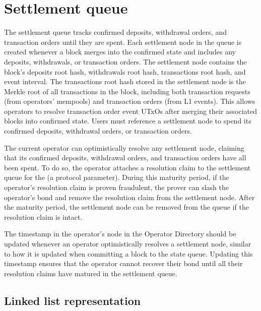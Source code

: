 \documentclass[../midgard.tex]{subfiles}
\begin{document}
\section{Settlement queue}
\label{h:settlement-queue}

The settlement queue tracks confirmed deposits, withdrawal orders, and transaction orders until they are spent.
Each settlement node in the queue is created whenever a block merges into the confirmed state and includes any deposits, withdrawals, or transaction orders.
The settlement node contains the block's deposits root hash, withdrawals root hash, transactions root hash, and event interval.
The transactions root hash stored in the settlement node is the Merkle root of all transactions in the block, including both transaction requests (from operators' mempools) and transaction orders (from L1 events).
This allows operators to resolve transaction order event UTxOs after merging their associated blocks into confirmed state.
Users must reference a settlement node to spend its confirmed deposits, withdrawal orders, or transaction orders.

The current operator can optimistically resolve any settlement node, claiming that its confirmed deposits, withdrawal orders, and transaction orders have all been spent.
To do so, the operator attaches a resolution claim to the settlement queue for the  (a protocol parameter).
During this maturity period, if the operator's resolution claim is proven fraudulent, the prover can slash the operator's bond and remove the resolution claim from the settlement node.
After the maturity period, the settlement node can be removed from the queue if the resolution claim is intact.


The timestamp in the operator's node in the Operator Directory should be updated whenever an operator optimistically resolves a settlement node, similar to how it is updated when committing a block to the state queue.
Updating this timestamp ensures that the operator cannot recover their bond until all their resolution claims have matured in the settlement queue.

\subsection{Linked list representation}%
\label{h:settlement-queue-linked-list}%
\end{document}
